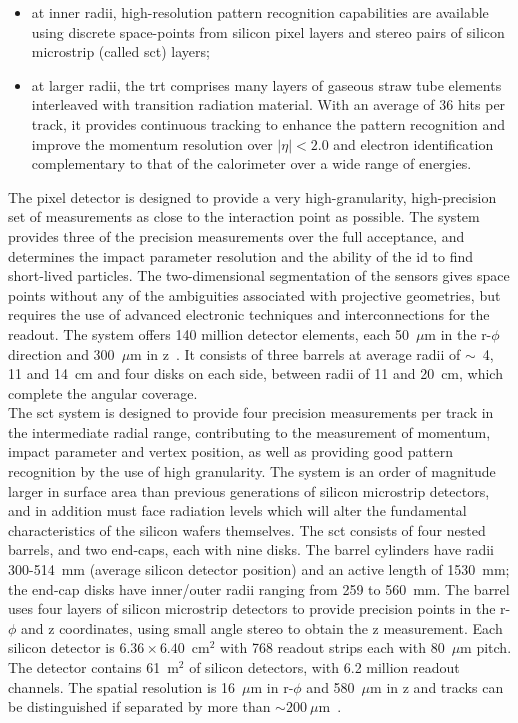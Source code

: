 \begin{itemize}
\item at inner radii, high-resolution pattern recognition capabilities are
  available using discrete space-points from silicon pixel layers and stereo
  pairs of silicon microstrip (called \gls{sct}) layers;
\item at larger radii, the \gls{trt} comprises many layers of gaseous straw tube
  elements interleaved with transition radiation material. With an average of 36
  hits per track, it provides continuous tracking to enhance the pattern
  recognition and improve the momentum resolution over $|\eta|<2.0$ and electron
  identification complementary to that of the calorimeter over a wide range of
  energies.
\end{itemize}
The pixel detector is designed to provide a very high-granularity,
high-precision set of measurements as close to the interaction point as
possible. The system provides three of the precision measurements over the full
acceptance, and determines the impact parameter resolution and the ability of
the \gls{id} to find short-lived particles. The two-dimensional segmentation of
the sensors gives space points without any of the ambiguities associated with
projective geometries, but requires the use of advanced electronic techniques
and interconnections for the readout. The system offers 140 million detector
elements, each 50~$\mu$m in the r-$\phi$ direction and 300~$\mu$m in
z~\cite{ATLAS:1997}. It consists of three barrels at average radii of $\sim$~4,
11 and 14~cm and four disks on each side,
between radii of 11 and 20~cm, which complete the angular coverage.\\
The \gls{sct} system is designed to provide four precision measurements per
track in the intermediate radial range, contributing to the measurement of
momentum, impact parameter and vertex position, as well as providing good
pattern recognition by the use of high granularity. The system is an order of
magnitude larger in surface area than previous generations of silicon microstrip
detectors, and in addition must face radiation levels which will alter the
fundamental characteristics of the silicon wafers themselves.  The \gls{sct}
consists of four nested barrels, and two end-caps, each with nine disks. The
barrel cylinders have radii 300-514~mm (average silicon detector position) and
an active length of 1530~mm; the end-cap disks have inner/outer radii ranging
from 259 to 560~mm.  The barrel uses four layers of silicon microstrip detectors
to provide precision points in the r-$\phi$ and z coordinates, using small angle
stereo to obtain the z measurement. Each silicon detector is
$6.36 \times 6.40$~cm$^2$ with 768 readout strips each with 80~$\mu $m
pitch. The detector contains 61~m$^2$ of silicon detectors, with 6.2 million
readout channels. The spatial resolution is 16~$\mu $m in r-$\phi$ and
580~$\mu $m in z and tracks can be distinguished if separated by more than
$\sim 200~\mu $m~\cite{ATLAS:1997}.

